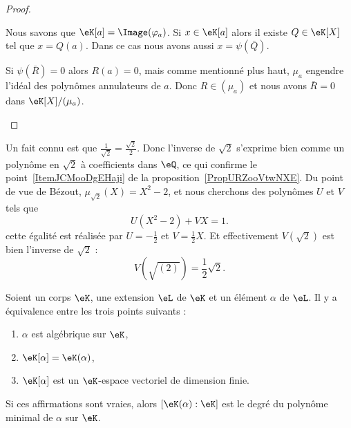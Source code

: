 \begin{proof}
\begin{enumerate}
\begin{subproof}
			      Nous savons que \( \eK[a]=\Image(\varphi_a)\). Si \( x\in \eK[a]\) alors il existe \( Q\in \eK[X]\) tel que \( x=Q(a)\). Dans ce cas nous avons aussi \( x=\psi(\bar Q)\).

			      \spitem[Injective]

			      Si \( \psi(\bar R)=0\) alors \( R(a)=0\), mais comme mentionné plus haut, \( \mu_a\) engendre l'idéal des polynômes annulateurs de \( a\). Donc \( R\in (\mu_a)\) et nous avons \( \bar R=0\) dans \( \eK[X]/(\mu_a)\).

		      \end{subproof}

	\end{enumerate}
\end{proof}

\begin{example}
	Un fait connu est que \( \frac{1}{ \sqrt{2} }=\frac{ \sqrt{2} }{ 2 }\). Donc l'inverse de \( \sqrt{2}\) s'exprime bien comme un polynôme en \( \sqrt{2}\) à coefficients dans \( \eQ\), ce qui confirme le point~\ref{ItemJCMooDgEHaji} de la proposition~\ref{PropURZooVtwNXE}. Du point de vue de Bézout, \( \mu_{\sqrt{2}}(X)=X^2-2\), et nous cherchons des polynômes \( U\) et \( V\) tels que
	\begin{equation}
		U(X^2-2)+VX=1.
	\end{equation}
	cette égalité est réalisée par \( U=-\frac{ 1 }{2}\) et \( V=\frac{ 1 }{2}X\). Et effectivement \( V(\sqrt{2})\) est bien l'inverse de \( \sqrt{2}\) :
	\begin{equation}
		V(\sqrt{(2)})=\frac{ 1 }{2}\sqrt{2}.
	\end{equation}
\end{example}


\begin{proposition}      \label{PROPooNGJWooYSpwVn}
	Soient un corps \( \eK\), une extension \( \eL\) de \( \eK\) et un élément \( \alpha\) de \( \eL\). Il y a équivalence entre les trois points suivants :
	\begin{enumerate}
		\item   \label{ITEMooYTEBooUuEfBz}
		      \( \alpha\) est algébrique sur \( \eK\),
		\item   \label{ITEMooWMQTooLnepQl}
		      \( \eK[\alpha]=\eK(\alpha)\),
		\item   \label{ITEMooAQIUooMVZojp}
		      \( \eK[\alpha]\) est un \( \eK\)-espace vectoriel de dimension finie.
	\end{enumerate}
	Si ces affirmations sont vraies, alors \( [\eK(\alpha):\eK]\) est le degré du polynôme minimal de \( \alpha\) sur \( \eK\).
\end{proposition}


